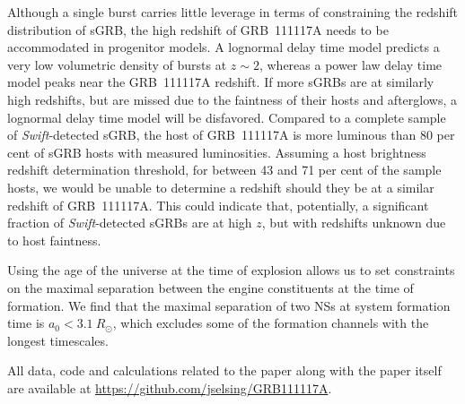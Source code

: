 \documentclass{aa}    %
\begin{document}
Although a single burst carries little leverage in terms of constraining the
redshift distribution of sGRB, the high redshift of GRB~111117A needs to be
accommodated in progenitor models. A lognormal delay time model predicts a very
low volumetric density of bursts at $z \sim 2$, whereas a power law delay time
model peaks near the GRB~111117A redshift. If more sGRBs are at similarly high
redshifts, but are missed due to the faintness of their hosts and afterglows, a
lognormal delay time model will be disfavored. Compared to a complete sample of
\textit{Swift}-detected sGRB, the host of GRB~111117A is more luminous than 80
per cent of sGRB hosts with measured luminosities. Assuming a host brightness
redshift determination threshold, for between 43 and 71 per cent of the sample
hosts, we would be unable to determine a redshift should they be at a similar
redshift of GRB~111117A. This could indicate that, potentially, a significant
fraction of \textit{Swift}-detected sGRBs are at high $z$, but with redshifts
unknown due to host faintness.

Using the age of the universe at the time of explosion allows us to set
constraints on the maximal separation between the engine constituents at the
time of formation. We find that the maximal separation of two NSs at system
formation time is $a_0 < 3.1~R_\odot$, which excludes some of the formation
channels with the longest timescales.

All data, code and calculations related to the paper along with the
paper itself are available at \url{https://github.com/jselsing/GRB111117A}.
\end{document}
